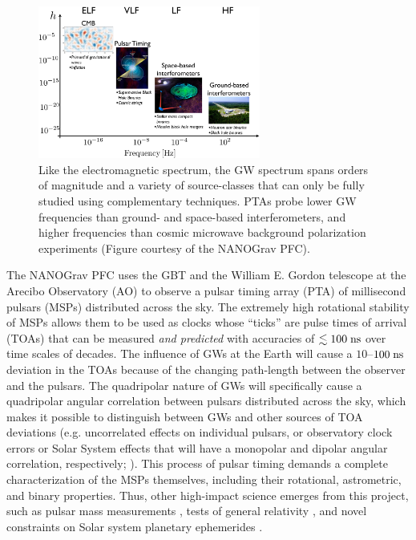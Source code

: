 \documentclass[10pt]{myNSF}
\begin{document}
\begin{figure}
  \centering
  \includegraphics[width=0.65\textwidth]{gw_spectrum.png}
  \caption{Like the electromagnetic spectrum, the GW spectrum spans
    orders of magnitude and a variety of source-classes that can only
    be fully studied using complementary techniques.  PTAs probe lower
    GW frequencies than ground- and space-based interferometers, and
    higher frequencies than cosmic microwave background polarization
    experiments (Figure courtesy of the NANOGrav
    PFC). \label{fig:gw_spectrum}}
\end{figure}

The NANOGrav PFC uses the GBT and the William E. Gordon telescope at
the Arecibo Observatory (AO) to observe a pulsar timing array (PTA) of
millisecond pulsars (MSPs) distributed across the sky.  The extremely
high rotational stability of MSPs allows them to be used as clocks
whose ``ticks'' are pulse times of arrival (TOAs) that can be measured
\emph{and predicted} with accuracies of $\lesssim 100\; \textrm{ns}$ over time
scales of decades.  The influence of GWs at the Earth will cause a
$10$--$100\; \textrm{ns}$ deviation in the TOAs because of the changing
path-length between the observer and the pulsars.  The quadripolar
nature of GWs will specifically cause a quadripolar angular
correlation between pulsars distributed across the sky, which makes it
possible to distinguish between GWs and other sources of TOA
deviations (e.g. uncorrelated effects on individual pulsars, or
observatory clock errors or Solar System effects that will have a
monopolar and dipolar angular correlation, respectively; \cite{hd83}).
This process of pulsar timing demands a complete characterization of
the MSPs themselves, including their rotational, astrometric, and
binary properties.  Thus, other high-impact science emerges from this
project, such as pulsar mass measurements \citep{epe+16}, tests of
general relativity \citep{zsd+15}, and novel constraints on Solar
system planetary ephemerides \citep{abb+18}.
\end{document}
